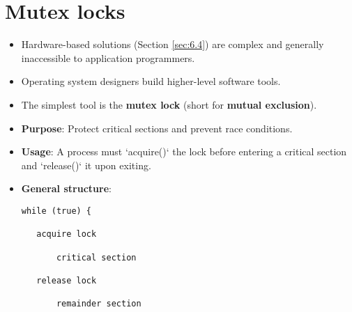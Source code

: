 \section{Mutex locks}
\begin{itemize}
    \item Hardware-based solutions (Section \ref{sec:6.4}) are complex and generally inaccessible to application programmers.
    \item Operating system designers build higher-level software tools.
    \item The simplest tool is the \textbf{mutex lock} (short for \textbf{mutual exclusion}).
    \item \textbf{Purpose}: Protect critical sections and prevent race conditions.
    \item \textbf{Usage}: A process must `acquire()` the lock before entering a critical section and `release()` it upon exiting.
    \item \textbf{General structure}:
\begin{verbatim}
while (true) {
 
   acquire lock
 
       critical section
 
   release lock
 
       remainder section
 

\end{verbatim}
\end{itemize}
